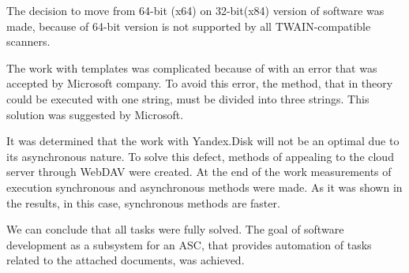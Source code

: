 \documentclass[12pt,journal,compsoc]{D:/Магистратура/English/bare_conf/IEEEtran}
\begin{document}
The decision to move from 64-bit (x64) on 32-bit(x84) version of software was made, because of 64-bit version is not supported by all TWAIN-compatible scanners.

The work with templates was complicated because of with  an error that was accepted by Microsoft company. To avoid this error, the method, that in theory could be executed with one string, must be divided into three strings. This solution was suggested by Microsoft.

It was determined that the work with Yandex.Disk will not be an optimal due to its asynchronous nature. To  solve this defect, methods of appealing to the cloud server through WebDAV were created. At the end of the work measurements of execution synchronous and asynchronous methods were made. As it was shown in the results, in this case, synchronous methods are faster.

We can conclude that all tasks were fully solved. The goal of  software development as a subsystem for an ASC, that provides automation of tasks related to the attached documents, was achieved.
\end{document}
